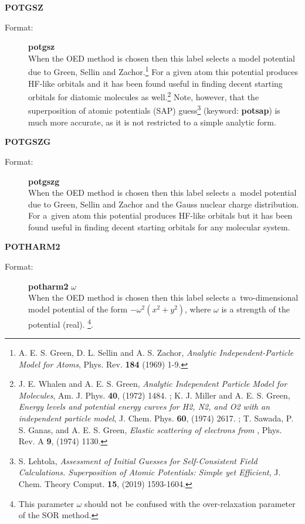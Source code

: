\documentclass[12pt,a4paper]{article}
\begin{document}
\begin{description}
\item \textbf{POTGSZ}
\begin{description}
\item[Format:] \textbf{potgsz} \\ When the OED method is chosen then
  this label selects a model potential due to Green, Sellin and
  Zachor.\footnote{A. E. S. Green, D. L. Sellin and A. S. Zachor,
    \textsl{Analytic Independent-Particle Model for Atoms},
    Phys. Rev. \textbf{184} (1969) 1-9. }
  For a given atom this potential produces HF-like orbitals and it has
  been found useful in finding decent starting orbitals for diatomic
  molecules as well.\footnote{J. E. Whalen and A. E. S. Green,
    \textsl{Analytic Independent Particle Model for Molecules},
    Am. J. Phys. \textbf{40}, (1972) 1484. ;
    K. J. Miller and A. E. S. Green, \textsl{Energy levels and
      potential energy curves for H2, N2, and O2 with an independent
      particle model}, J. Chem. Phys. \textbf{60}, (1974)
    2617. ; T. Sawada, P. S. Ganas, and
    A. E. S. Green, \textsl{Elastic scattering of electrons from
      }, Phys. Rev. A \textbf{9}, (1974)
    1130. } Note, however, that the
  superposition of atomic potentials (SAP) guess\footnote{S. Lehtola,
    \textsl{Assessment of Initial Guesses for Self-Consistent Field
      Calculations. Superposition of Atomic Potentials: Simple yet
      Efficient}, J. Chem. Theory Comput. \textbf{15}, (2019)
    1593-1604. } (keyword:
  \textbf{potsap}) is much more accurate, as it is not restricted to a
  simple analytic form.
\end{description}


\item \textbf{POTGSZG}
\begin{description}
\item[Format:] \textbf{potgszg} \\ When the OED method is chosen then
  this label selects a~model potential due to Green, Sellin and Zachor
  and the Gauss nuclear charge distribution. For a~given atom this
  potential produces HF-like orbitals but it has been found useful in
  finding decent starting orbitals for any molecular system.
\end{description}


\item \textbf{POTHARM2}
\begin{description}
\item[Format:] \textbf{potharm2} $\omega$ \\ When the OED method is chosen then this
  label selects a~two-dimensional model potential of the form $-\omega^2(x^2+y^2)$, where
  $\omega$ is a strength of the potential (real).%
  \footnote{This parameter $\omega$ should not be confused with the
    over-relaxation parameter of the SOR method.}.
\end{description}



\end{description}
\end{document}
